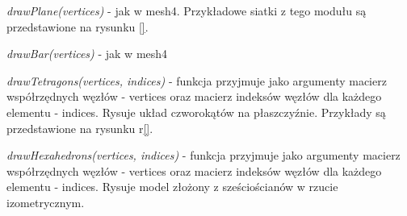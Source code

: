 \textit{drawPlane(vertices)} - jak w mesh4. Przykładowe siatki z tego modułu są przedstawione na rysunku \ref{}.

\textit{drawBar(vertices)} - jak w mesh4

\textit{drawTetragons(vertices, indices)} - funkcja przyjmuje jako argumenty macierz współrzędnych węzłów - vertices oraz macierz indeksów węzłów dla każdego elementu - indices. Rysuje układ czworokątów na płaszczyźnie. Przykłady są przedstawione na rysunku r\ref{}.

\textit{drawHexahedrons(vertices, indices)} - funkcja przyjmuje jako argumenty macierz współrzędnych węzłów - vertices oraz macierz indeksów węzłów dla każdego elementu - indices. Rysuje model złożony z sześciościanów w rzucie izometrycznym.
